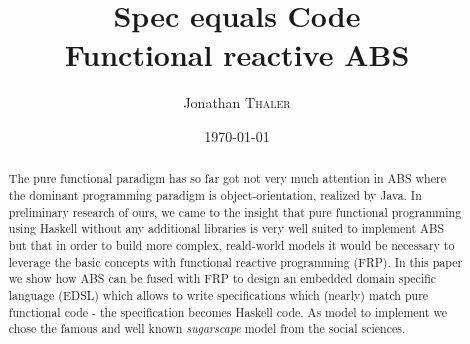 \documentclass[twocolumn]{article}
\title{Spec equals Code \\ Functional reactive ABS} %
\author{Jonathan \textsc{Thaler}} %
\date{\today} %
\begin{document}
\maketitle %

\begin{abstract}
The pure functional paradigm has so far got not very much attention in ABS where the dominant programming paradigm is object-orientation, realized by Java. In preliminary research of ours, we came to the insight that pure functional programming using Haskell without any additional libraries is very well suited to implement ABS but that in order to build more complex, reald-world models it would be necessary to leverage the basic concepts with functional reactive programming (FRP). In this paper we show how ABS can be fused with FRP to design an embedded domain specific language (EDSL) which allows to write specifications which (nearly) match pure functional code - the specification becomes Haskell code. As model to implement we chose the famous and well known \textit{sugarscape} model from the social sciences.
\end{abstract}













\end{document}
